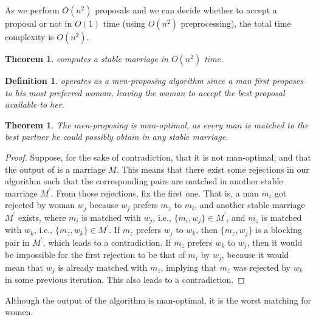 \documentclass[12pt]{report}
\newtheorem{ttheorem}[base]{Theorem}
\newtheorem{ddef}[base]{Definition}
\numberwithin{algorithm}{chapter}
\begin{document}
	As we perform $O(n^{2})$ proposals and we can decide whether to accept a proposal or not in $O(1)$ time (using $O(n^{2})$ preprocessing), the total time complexity is $O(n^{2})$.

	\begin{ttheorem}
		 computes a stable marriage in $O(n^{2})$ time.
	\end{ttheorem}

	\begin{ddef}
		 operates as a men-proposing algorithm since a man first proposes to his most preferred woman, leaving the woman to accept the best proposal available to her.
	\end{ddef}

	\begin{ttheorem}\label{stableMarriage-man-optimal}
		The men-proposing  is man-optimal, as every man is matched to the best partner he could possibly obtain in any stable marriage.
	\end{ttheorem}
	\begin{proof}
		Suppose, for the sake of contradiction, that it is not man-optimal, and that the output of  is a marriage $M$. This means that there exist some rejections in our algorithm such that the corresponding pairs are matched in another stable marriage $M^{'}$. From those rejections, fix the first one. That is, a man $m_{i}$ got rejected by woman $w_{j}$ because $w_{j}$ prefers $m_{z}$ to $m_{i}$, and another stable marriage $M^{'}$ exists, where $m_{i}$ is matched with $w_{j}$, i.e., $\{m_{i}, w_{j}\} \in M^{'}$, and $m_{z}$ is matched with $w_{k}$, i.e., $\{m_{z}, w_{k}\} \in M^{'}$. If $m_{z}$ prefers $w_{j}$ to $w_{k}$, then $\{m_{z}, w_{j}\}$ is a blocking pair in $M^{'}$, which leads to a contradiction. If $m_{z}$ prefers $w_{k}$ to $w_{j}$, then it would be impossible for the first rejection to be that of $m_{i}$ by $w_{j}$, because it would mean that $w_{j}$ is already matched with $m_{z}$, implying that $m_{z}$ was rejected by $w_{k}$ in some previous iteration. This also leads to a contradiction.
	\end{proof}
	
	Although the output of the algorithm is man-optimal, it is the worst matching for women.	
\end{document}
